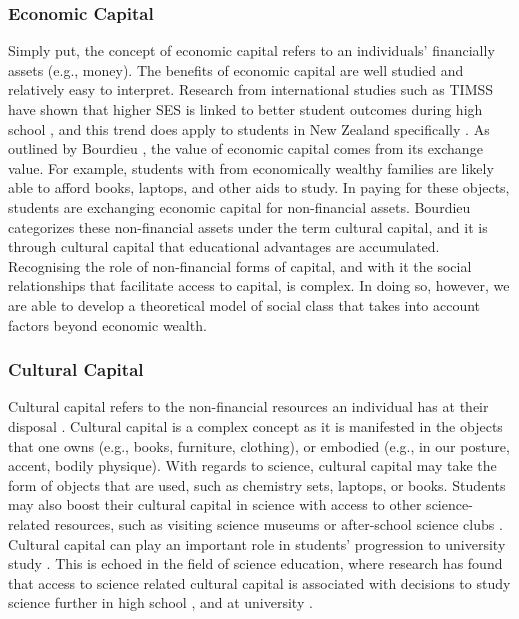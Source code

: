 \subsubsection*{Economic Capital}
Simply put, the concept of economic capital refers to an individuals' financially assets (e.g., money). The benefits of economic capital are well studied and relatively easy to interpret. Research from international studies such as TIMSS have shown that higher SES is linked to better student outcomes during high school \cite{Mullis_2012,mullis2016timss}, and this trend does apply to students in New Zealand specifically \cite{May_2016}. As outlined by Bourdieu \cite{Bourdieu_1986}, the value of economic capital comes from its exchange value. For example, students with from economically wealthy families are likely able to afford books, laptops, and other aids to study. In paying for these objects, students are exchanging economic capital for non-financial assets. Bourdieu categorizes these non-financial assets under the term cultural capital, and it is through cultural capital that educational advantages are accumulated. Recognising the role of non-financial forms of capital, and with it the social relationships that facilitate access to capital, is complex. In doing so, however, we are able to develop a theoretical model of social class that takes into account factors beyond economic wealth. 

\subsubsection*{Cultural Capital}
Cultural capital refers to the non-financial resources an individual has at their disposal \cite{Bourdieu_1986}. Cultural capital is a complex concept as it is manifested in the objects that one owns (e.g., books, furniture, clothing), or embodied (e.g., in our posture, accent, bodily physique). With regards to science, cultural capital may take the form of objects that are used, such as chemistry sets, laptops, or books. Students may also boost their cultural capital in science with access to other science-related resources, such as visiting science museums \cite{Dawson2014} or after-school science clubs \cite{mujtaba2018students}. Cultural capital can play an important role in students' progression to university study \cite{aschaffenburg1997cultural}. This is echoed in the field of science education, where research has found that access to science related cultural capital is associated with decisions to study science further in high school \cite{mujtaba2018students}, and at university \cite{Lyons_2006}.

